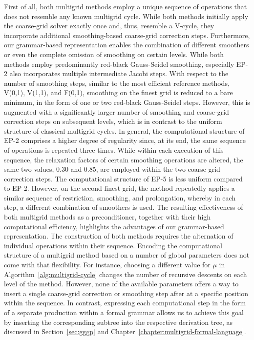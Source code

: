 First of all, both multigrid methods employ a unique sequence of operations that does not resemble any known multigrid cycle.
While both methods initially apply the coarse-grid solver exactly once and, thus, resemble a V-cycle, they incorporate additional smoothing-based coarse-grid correction steps.
Furthermore, our grammar-based representation enables the combination of different smoothers or even the complete omission of smoothing on certain levels.
While both methods employ predominantly red-black Gauss-Seidel smoothing, especially EP-2 also incorporates multiple intermediate Jacobi steps.
With respect to the number of smoothing steps, similar to the most efficient reference methods, V(0,1), V(1,1), and F(0,1), smoothing on the finest grid is reduced to a bare minimum, in the form of one or two red-black Gauss-Seidel steps.
However, this is augmented with a significantly larger number of smoothing and coarse-grid correction steps on subsequent levels, which is in contrast to the uniform structure of classical multigrid cycles.
In general, the computational structure of EP-2 comprises a higher degree of regularity since, at its end,
the same sequence of operations is repeated three times.
While within each execution of this sequence, the relaxation factors of certain smoothing operations are altered, the same two values, 0.30 and 0.85, are employed within the two coarse-grid correction steps.
The computational structure of EP-5 is less uniform compared to EP-2.
However, on the second finest grid, the method repeatedly applies a similar sequence of restriction, smoothing, and prolongation, whereby in each step, a different combination of smoothers is used.
The resulting effectiveness of both multigrid methods as a preconditioner, together with their high computational efficiency, highlights the advantages of our grammar-based representation.
The construction of both methods requires the alternation of individual operations within their sequence.
Encoding the computational structure of a multigrid method based on a number of global parameters does not come with that flexibility.
For instance, choosing a different value for $\mu$ in Algorithm~\ref{alg:multigrid-cycle} changes the number of recursive descents on each level of the method.
However, none of the available parameters offers a way to insert a single coarse-grid correction or smoothing step after at a specific position within the sequence.
In contrast, expressing each computational step in the form of a separate production within a formal grammar allows us to achieve this goal by inserting the corresponding subtree into the respective derivation tree, as discussed in Section~\ref{sec:gggp} and Chapter~\ref{chapter:multigrid-formal-language}.

